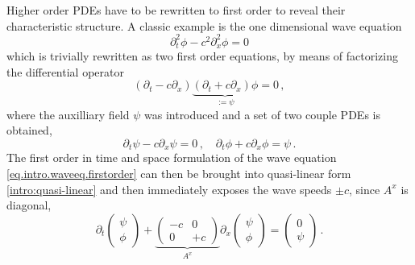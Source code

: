 Higher order PDEs have to be rewritten to first order to reveal their
characteristic structure. A classic example is the one dimensional wave equation~\cite{Toro99}
\begin{equation}
\partial_t^2 \phi - c^2 \partial_x^2 \phi = 0
\end{equation}
which is trivially rewritten as two first order equations, by means of factorizing
the differential operator
\begin{equation}
\left( \partial_t - c \partial_x \right)
\underbrace{ \left( \partial_t + c \partial_x \right) \phi }_{:= \psi}
= 0 \,,
\end{equation}
where the auxilliary field $\psi$ was introduced
and a set of two couple PDEs is obtained,
\begin{equation}\label{eq.intro.waveeq.firstorder}
\partial_t \psi - c \partial_x \psi = 0
\,,\quad
\partial_t \phi + c \partial_x \phi = \psi
\,.
\end{equation}
The first order in time and space formulation of the wave equation 
\eqref{eq.intro.waveeq.firstorder} can then be brought into quasi-linear
form \eqref{intro:quasi-linear} and then immediately exposes the wave speeds
$\pm c$, since $A^x$ is diagonal,
\begin{equation}\label{eq.intro.waveeq.A}
\partial_t
\begin{pmatrix} \psi \\ \phi \end{pmatrix}
+
\underbrace{
\begin{pmatrix} -c & 0 \\ 0 & +c  \end{pmatrix}
}_{A^x}
\partial_x
\begin{pmatrix} \psi \\ \phi \end{pmatrix}
= 
\begin{pmatrix} 0 \\ \psi \end{pmatrix}
\,.
\end{equation}%

